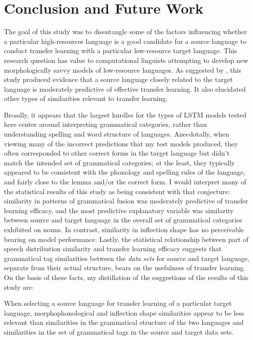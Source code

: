 \chapter{Conclusion and Future Work}

The goal of this study was to disentangle some of the factors influencing whether a particular high-resources language is a good candidate for a source language to conduct transfer learning with a particular low-resource target language. This research question has value to computational linguists attempting to develop new morphologically savvy models of low-resource languages. As suggested by \cite{McCarthy2019}, this study produced evidence that a source language closely related to the target language is moderately predictive of effective transfer learning. It also elucidated other types of similarities relevant to transfer learning. 

Broadly, it appears that the largest hurdles for the types of LSTM models tested here center around interpreting grammatical categories, rather than understanding spelling and word structure of languages. Anecdotally, when viewing many of the incorrect predictions that my test models produced, they often corresponded to other correct forms in the target language but didn't match the intended set of grammatical categories; at the least, they typically appeared to be consistent with the phonology and spelling rules of the language, and fairly close to the lemma and/or the correct form. I would interpret many of the statistical results of this study as being consistent with that conjecture: similarity in patterns of grammatical fusion was moderately predictive of transfer learning efficacy, and the most predictive explanatory variable was similarity between source and target language in the overall set of grammatical categories exhibited on nouns. In contrast, similarity in inflection shape has no perceivable bearing on model performance. Lastly, the statistical relationship between part of speech distribution similarity and transfer learning efficacy suggests that grammatical tag similarities between the \textit{data sets} for source and target language, separate from their actual structure, bears on the usefulness of transfer learning. On the basis of these facts, my distillation of the suggestions of the results of this study are:

\begin{center}
    When selecting a source language for transfer learning of a particular target language, morphophonological and inflection shape similarities appear to be less relevant than similarities in the grammatical structure of the two languages and similarities in the set of grammatical tags in the source and target data sets.
\end{center}

